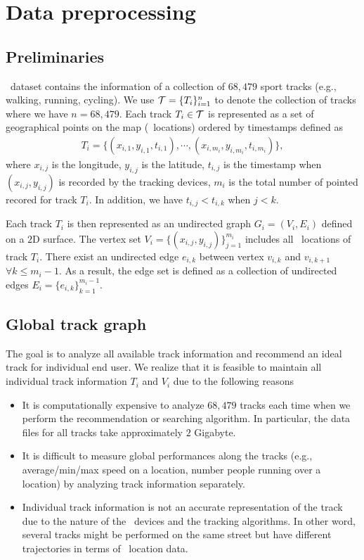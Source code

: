 
\section{Data preprocessing}

\subsection{Preliminaries}

\edmd\ dataset contains the information of a collection of $68,479$ sport tracks (e.g., walking, running, cycling).
We use $\mathcal{T}=\{T_i\}_{i=1}^n$ to denote the collection of tracks where we have $n=68,479$.
Each track $T_i\in\mathcal{T}$ is represented as a set of geographical points on the map (\gps\ locations) ordered by timestamps defined as
\begin{align*}
	T_i = \{(x_{i,1},y_{i,1},t_{i,1}),\cdots,(x_{i,m_i},y_{i,m_i},t_{i,m_i})\},
\end{align*}
where $x_{i,j}$ is the longitude, $y_{i,j}$ is the latitude, $t_{i,j}$ is the timestamp when $(x_{i,j},y_{i,j})$ is recorded by the tracking devices, $m_i$ is the total number of pointed recored for track $T_i$.
In addition, we have $t_{i,j}<t_{i,k}$ when $j<k$.

Each track $T_i$ is then represented as an undirected graph $G_i = (V_i,E_i)$ defined on a $2$D surface.
The vertex set $V_i=\{(x_{i,j},y_{i,j})\}_{j=1}^{m_i}$ includes all \gps\ locations of track $T_i$.
There exist an undirected edge $e_{i,k}$ between vertex $v_{i,k}$ and $v_{i,k+1}$ $\forall k\le m_i-1$.
As a result, the edge set is defined as a collection of undirected edges $E_i = \{e_{i,k}\}_{k=1}^{m_i-1}$.

\subsection{Global track graph}\label{build_global_graph}

The goal is to analyze all available track information and recommend an ideal track for individual end user.
We realize that it is feasible to maintain all individual track information $T_i$ and $V_i$ due to the following reasons
\begin{itemize}
	\item It is computationally expensive to analyze $68,479$ tracks each time when we perform the recommendation or searching algorithm. In particular, the data files for all tracks take approximately $2$ Gigabyte.
	\item It is difficult to measure global performances along the tracks (e.g., average/min/max speed on a location, number people running over a location) by analyzing track information separately. 
	\item Individual track information is not an accurate representation of the track due to the nature of the \gps\ devices and the tracking algorithms. In other word, several tracks might be performed on the same street but have different trajectories in terms of \gps\ location data. 
\end{itemize} 

